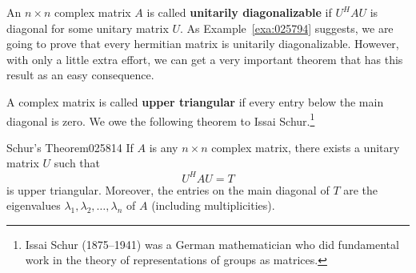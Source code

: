 An $n \times n$ complex matrix $A$ is called \textbf{unitarily diagonalizable} if $U^{H}AU$ is diagonal for some unitary matrix $U$. As Example~\ref{exa:025794} suggests, we are going to prove that every hermitian matrix is unitarily diagonalizable. However, with only a little extra effort, we can get a very important theorem that has this result as an easy consequence.


A complex matrix is called \textbf{upper triangular} if every entry below the main diagonal is zero. We owe the following theorem to Issai Schur.\footnote{Issai
 Schur (1875--1941) was a German mathematician who did fundamental work 
in the theory of representations of groups as matrices.}

\begin{theorem}{Schur's Theorem}{025814}
If $A$ is any $n \times n$ complex matrix, there exists a unitary matrix $U$ such that
\begin{equation*}
U^HAU = T
\end{equation*}
is upper triangular. Moreover, the entries on the main diagonal of $T$ are the eigenvalues $\lambda_{1}, \lambda_{2}, \dots, \lambda_{n}$ of $A$ (including multiplicities).
\end{theorem}

